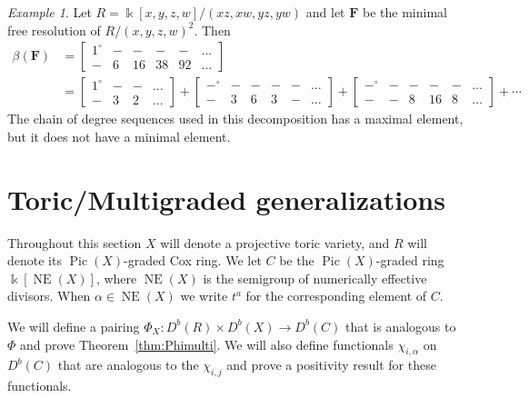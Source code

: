 \documentclass[12pt]{amsart}
\theoremstyle{definition}
\theoremstyle{remark}
\newtheorem{example}[lemma]{Example}
\newcommand{\Pic}{\operatorname{Pic}}
\newcommand{\Cox}{\operatorname{Cox}}
\newcommand{\NE}{\operatorname{NE}}
\newcommand{\irr}{\operatorname{irr}}
\newcommand{\kk}{\Bbbk}
\newcommand{\FF}{\mathbf{F}}
\newcommand{\zp}{\circ}
\begin{document}
\begin{example}
Let $R=\kk[x,y,z,w]/(xz,xw,yz,yw)$ and let $\FF$ be the minimal free resolution of $R/(x,y,z,w)^2$.  Then
\begin{align*}
\beta(\FF)&=\begin{bmatrix}1^\zp&-&-&-&-&\dots \\ -&6&16&38&92&\dots \end{bmatrix}\\
&=\begin{bmatrix}1^\zp&-&-&\dots \\ -&3&2&\dots \end{bmatrix}
+
\begin{bmatrix}-^\zp&-&-&-&-&\dots \\ -&3&6&3&-&\dots \end{bmatrix}
+
\begin{bmatrix}-^\zp&-&-&-&-&\dots \\ -&-&8&16&8&\dots \end{bmatrix}
+
\cdots
\end{align*}
The chain of degree sequences used in this decomposition has a maximal element, but it does not have a minimal element.
\end{example}


\section{Toric/Multigraded generalizations}\label{sec:toric}
Throughout this section $X$ will denote a projective toric variety, and $R$ will denote its
 $\Pic(X)$-graded Cox ring. We let $C$ be the $\Pic(X)$-graded ring $\kk[\NE(X)]$,
 where $\NE(X)$ is the semigroup of numerically effective divisors. 
 When $\alpha\in \NE(X)$ we write $t^{a}$ for the corresponding element of $C$.

We will define a pairing $\Phi_{X}: D^{b}(R) \times D^{b}(X) \to D^{b}(C)$ that is analogous to
$\Phi$ and prove Theorem~\ref{thm:Phimulti}.  We will also define functionals $\chi_{i,\alpha}$ on $D^{b}(C)$ that are analogous to the 
$\chi_{i,j}$ and prove a positivity result for these functionals.


\end{document}
